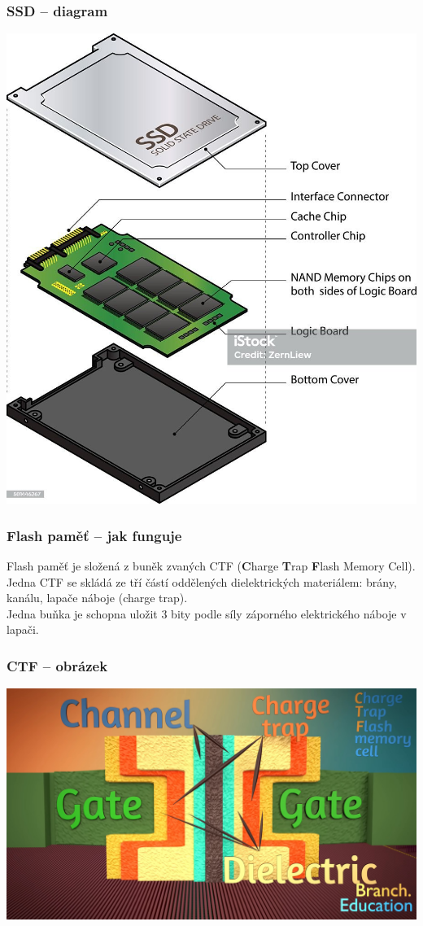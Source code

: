 \documentclass[aspectratio=169,11pt,svgnames]{beamer}
\begin{document}
\begin{frame}
 \frametitle{SSD -- diagram}
 \begin{center}
  \includegraphics[width=.4\textwidth]{ssd}
 \end{center}
\end{frame}

\begin{frame}
 \frametitle{Flash paměť -- jak funguje}
 Flash paměť je složená z buněk zvaných CTF (\textbf{C}harge \textbf{T}rap
 \textbf{F}lash Memory Cell).\\
 \pause
 Jedna CTF se skládá ze tří částí oddělených dielektrických materiálem: brány,
 kanálu, lapače náboje (charge trap).\\
 \pause
 Jedna buňka je schopna uložit 3 bity podle síly záporného elektrického náboje v
 lapači.
\end{frame}

\begin{frame}
 \frametitle{CTF -- obrázek}
 \begin{center}
  \includegraphics[width=.8\textwidth]{ctf}
 \end{center}
\end{frame}
\end{document}
